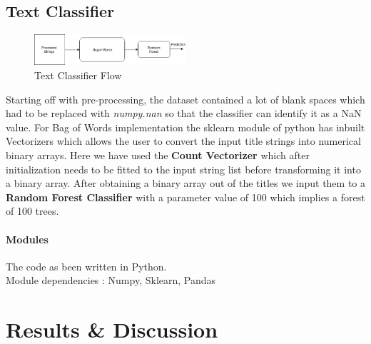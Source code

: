 \documentclass[conference]{IEEEtran}
\begin{document}
\subsection{Text Classifier}

\begin{figure}[htbp]
\centerline{\includegraphics[width=0.5\textwidth]{pics/block_images/text.png}}
\caption{ Text Classifier Flow }
\label{fig:textflow}
\end{figure}%


Starting off with pre-processing, the dataset contained a lot of blank spaces which had to be replaced with \emph{numpy.nan} so that the classifier can identify it as a NaN value. For Bag of Words implementation the sklearn module of python has inbuilt Vectorizers which allows the user to convert the input title strings into numerical binary arrays. Here we have used the \textbf{Count Vectorizer} which after initialization needs to be fitted to the input string list before transforming it into a binary array. After obtaining a binary array out of the titles we input them to a \textbf{Random Forest Classifier} with a parameter value of 100 which implies a forest of 100 trees.

\paragraph{Modules\\}
The code as been written in Python.\\
Module dependencies : Numpy, Sklearn, Pandas

\section{Results \& Discussion}

%
%
%
%
\end{document}
